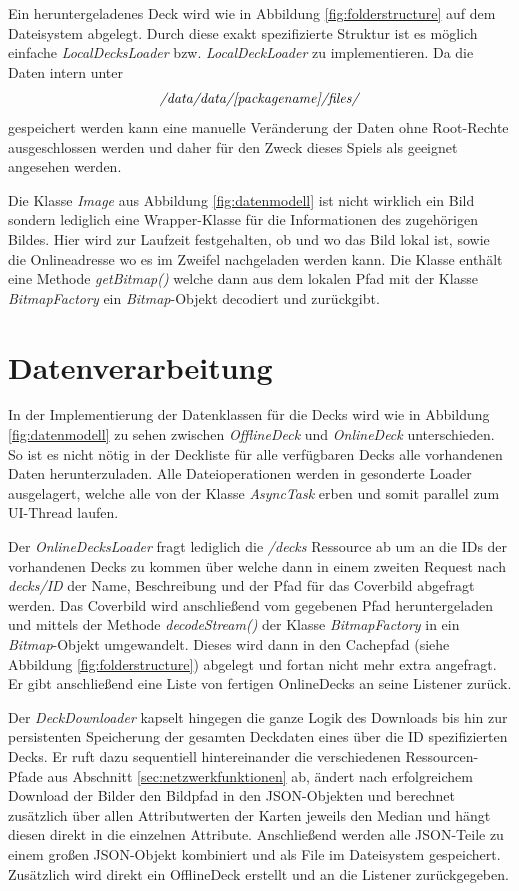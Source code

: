 Ein heruntergeladenes Deck wird wie in Abbildung \ref{fig:folderstructure} auf dem Dateisystem abgelegt. Durch diese exakt spezifizierte Struktur ist es möglich einfache \emph{LocalDecksLoader} bzw. \emph{LocalDeckLoader} zu implementieren. Da die Daten intern unter 
\begin{align*}
\emph{/data/data/[packagename]/files/}
\end{align*}
gespeichert werden kann eine manuelle Veränderung der Daten ohne Root-Rechte ausgeschlossen werden und daher für den Zweck dieses Spiels als geeignet angesehen werden.

Die Klasse \emph{Image} aus Abbildung \ref{fig:datenmodell} ist nicht wirklich ein Bild sondern lediglich eine Wrapper-Klasse für die Informationen des zugehörigen Bildes. Hier wird zur Laufzeit festgehalten, ob und wo das Bild lokal ist, sowie die Onlineadresse wo es im Zweifel nachgeladen werden kann. Die Klasse enthält eine Methode \emph{getBitmap()} welche dann aus dem lokalen Pfad mit der Klasse \emph{BitmapFactory} ein \emph{Bitmap}-Objekt decodiert und zurückgibt.


\section{Datenverarbeitung}
In der Implementierung der Datenklassen für die Decks wird wie in Abbildung \ref{fig:datenmodell} zu sehen zwischen \emph{OfflineDeck} und \emph{OnlineDeck} unterschieden. So ist es nicht nötig in der Deckliste für alle verfügbaren Decks alle vorhandenen Daten herunterzuladen. Alle Dateioperationen werden in gesonderte Loader ausgelagert, welche alle von der Klasse \emph{AsyncTask} erben und somit parallel zum UI-Thread laufen.

Der \emph{OnlineDecksLoader} fragt lediglich die \emph{/decks} Ressource ab um an die IDs der vorhandenen Decks zu kommen über welche dann in einem zweiten Request nach \emph{decks/ID} der Name, Beschreibung und der Pfad für das Coverbild abgefragt werden. Das Coverbild wird anschließend vom gegebenen Pfad heruntergeladen und mittels der Methode \emph{decodeStream()} der Klasse \emph{BitmapFactory} in ein \emph {Bitmap}-Objekt umgewandelt. Dieses wird dann in den Cachepfad (siehe Abbildung \ref{fig:folderstructure}) abgelegt und fortan nicht mehr extra angefragt. Er gibt anschließend eine Liste von fertigen OnlineDecks an seine Listener zurück.

Der \emph{DeckDownloader} kapselt hingegen die ganze Logik des Downloads bis hin zur persistenten Speicherung der gesamten Deckdaten eines über die ID spezifizierten Decks. Er ruft dazu sequentiell hintereinander die verschiedenen Ressourcen-Pfade aus Abschnitt \ref{sec:netzwerkfunktionen} ab, ändert nach erfolgreichem Download der Bilder den Bildpfad in den JSON-Objekten und berechnet zusätzlich über allen Attributwerten der Karten jeweils den Median und hängt diesen direkt in die einzelnen Attribute. Anschließend werden alle JSON-Teile zu einem großen JSON-Objekt kombiniert und als File im Dateisystem gespeichert. Zusätzlich wird direkt ein OfflineDeck erstellt und an die Listener zurückgegeben.

